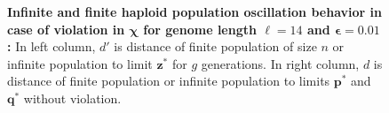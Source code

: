 \begin{figure}[h]
\begin{center}
\hspace{-3em}%
\vspace{-0.5em} \hspace{-3em}%

\caption[\textbf{Infinite and finite haploid population oscillation behavior in case of violation in $\bm{\chi}$ for genome length $\ell = 14$ and $\bm{\epsilon} = 0.01$}]{\textbf{Infinite and finite haploid population oscillation behavior in case of violation in $\bm{\chi}$ for genome length $\ell = 14$ and $\bm{\epsilon} = 0.01$:} 
  In left column, $d'$ is distance of finite population of size $n$ or infinite population to limit $\bm{z}^\ast$ for $g$ generations. In right column, $d$ is distance of finite population or infinite population to limits $\bm{p}^\ast$ and $\bm{q}^\ast$ without violation.}
\label{oscillation_14h_vio_chi_0.01}
\end{center}
\end{figure}

